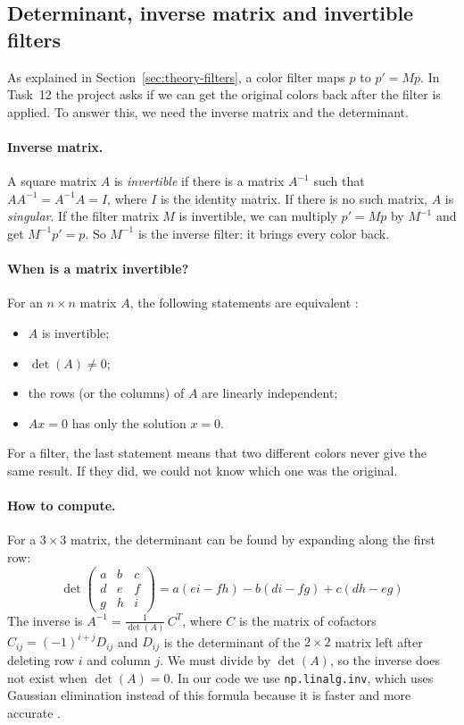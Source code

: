 
\subsection{Determinant, inverse matrix and invertible filters}\label{sec:theory-inverse}

As explained in Section~\ref{sec:theory-filters}, a color filter maps $p$ to
$p' = Mp$. In Task~12 the project asks if we can get the original colors back
after the filter is applied. To answer this, we need the inverse matrix and the
determinant.

\paragraph{Inverse matrix.}
A square matrix $A$ is \emph{invertible} if there is a matrix $A^{-1}$ such that
$AA^{-1} = A^{-1}A = I$, where $I$ is the identity matrix. If there is no such
matrix, $A$ is \emph{singular}. If the filter matrix $M$ is invertible, we can
multiply $p' = Mp$ by $M^{-1}$ and get $M^{-1}p' = p$. So $M^{-1}$ is the inverse
filter: it brings every color back.

\paragraph{When is a matrix invertible?}
For an $n \times n$ matrix $A$, the following statements are equivalent
\cite{strang2016}:
\begin{itemize}
  \item $A$ is invertible;
  \item $\det(A) \neq 0$;
  \item the rows (or the columns) of $A$ are linearly independent;
  \item $Ax = 0$ has only the solution $x = 0$.
\end{itemize}
For a filter, the last statement means that two different colors never give the
same result. If they did, we could not know which one was the original.

\paragraph{How to compute.}
For a $3 \times 3$ matrix, the determinant can be found by expanding along the
first row:
\[
  \det\begin{pmatrix} a & b & c \\ d & e & f \\ g & h & i \end{pmatrix}
  = a(ei - fh) - b(di - fg) + c(dh - eg)
\]
The inverse is $A^{-1} = \frac{1}{\det(A)}\,C^{T}$, where $C$ is the matrix of
cofactors $C_{ij} = (-1)^{i+j} D_{ij}$ and $D_{ij}$ is the determinant of the
$2 \times 2$ matrix left after deleting row $i$ and column $j$. We must divide by
$\det(A)$, so the inverse does not exist when $\det(A) = 0$. In our code we use
\texttt{np.linalg.inv}, which uses Gaussian elimination instead of this formula
because it is faster and more accurate \cite{higham2002}.

